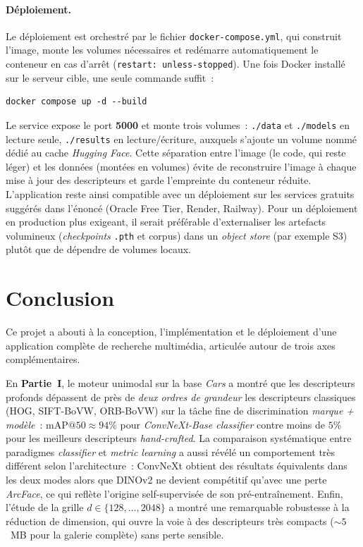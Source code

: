 \documentclass[a4paper,11pt]{article}
\begin{document}
\paragraph{Déploiement.}
Le déploiement est orchestré par le fichier \texttt{docker-compose.yml},
qui construit l'image, monte les volumes nécessaires et redémarre
automatiquement le conteneur en cas d'arrêt (\texttt{restart:
unless-stopped}). Une fois Docker installé sur le serveur cible, une
seule commande suffit~:
\begin{verbatim}
docker compose up -d --build
\end{verbatim}
Le service expose le port \textbf{5000} et monte trois volumes~:
\texttt{./data} et \texttt{./models} en lecture seule, \texttt{./results}
en lecture/écriture, auxquels s'ajoute un volume nommé dédié au cache
\textit{Hugging Face}. Cette séparation entre l'image (le code, qui
reste léger) et les données (montées en volumes) évite de reconstruire
l'image à chaque mise à jour des descripteurs et garde l'empreinte du
conteneur réduite. L'application reste ainsi compatible avec un
déploiement sur les services gratuits suggérés dans l'énoncé
(Oracle Free Tier, Render, Railway). Pour un déploiement en production
plus exigeant, il serait préférable d'externaliser les artefacts
volumineux (\textit{checkpoints} \texttt{.pth} et corpus) dans un
\textit{object store} (par exemple S3) plutôt que de dépendre de
volumes locaux.

\newpage
\section{Conclusion}
\label{sec:conclusion}

Ce projet a abouti à la conception, l'implémentation et le déploiement
d'une application complète de recherche multimédia, articulée autour de
trois axes complémentaires.

En \textbf{Partie~I}, le moteur unimodal sur la base \textit{Cars} a
montré que les descripteurs profonds dépassent de près de \emph{deux
ordres de grandeur} les descripteurs classiques (HOG, SIFT-BoVW,
ORB-BoVW) sur la tâche fine de discrimination
\textit{marque + modèle}~: $\text{mAP}@50 \approx 94\%$ pour
\textit{ConvNeXt-Base classifier} contre moins de $5\%$ pour les
meilleurs descripteurs \textit{hand-crafted}. La comparaison
systématique entre paradigmes \textit{classifier} et \textit{metric
learning} a aussi révélé un comportement très différent selon
l'architecture~: ConvNeXt obtient des résultats équivalents dans les
deux modes alors que DINOv2 ne devient compétitif qu'avec une perte
\textit{ArcFace}, ce qui reflète l'origine self-supervisée de son
pré-entraînement. Enfin, l'étude de la grille
$d \in \{128,\dots,2048\}$ a montré une remarquable robustesse à la
réduction de dimension, qui ouvre la voie à des descripteurs très
compacts ($\sim 5$~MB pour la galerie complète) sans perte sensible.
\end{document}
